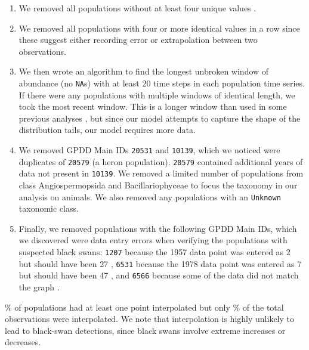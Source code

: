 \documentclass[12pt]{article}
\begin{document}
\begin{enumerate}
\item We removed all populations without at least four unique values
  \citep{brook2006a}.

\item We removed all populations with four or more identical values in a row
  since these suggest either recording error or extrapolation between two
  observations.

\item We then wrote an algorithm to find the longest unbroken window of
  abundance (no \texttt{NA}s) with at least $20$ time steps in each population
  time series. If there were any populations with multiple windows of identical
  length, we took the most recent window. This is a longer window than used in
  some previous analyses \citep{brook2006a}, but since our model
  attempts to capture the shape of the distribution tails, our model requires
  more data.

\item We removed GPDD Main IDs \texttt{20531} and \texttt{10139}, which we
  noticed were duplicates of \texttt{20579} (a heron population).
  \texttt{20579} contained additional years of data not present in
  \texttt{10139}. We removed a limited number of populations from class
  Angiospermopsida and Bacillariophyceae to focus the taxonomy in our analysis
  on animals. We also removed any populations with an \texttt{Unknown}
  taxonomic class.

\item Finally, we removed populations with the following GPDD Main IDs, which
  we discovered were data entry errors when verifying the populations with
  suspected black swans: \texttt{1207} because the 1957 data point was entered
  as 2 but should have been 27 \citep{kendeigh1982}, \texttt{6531} because the
  1978 data point was entered as 7 but should have been 47 \citep{minot1986},
  and \texttt{6566} because some of the data did not match the graph
  \citep{heessen1996}.

\end{enumerate}

\noindent
\percImputedPops\% of populations had at least one point interpolated but
only \percImputedPoints\% of the total observations were interpolated.
We note that interpolation is highly unlikely to lead to
black-swan detections, since black swans involve extreme increases or
decreases.
\end{document}
